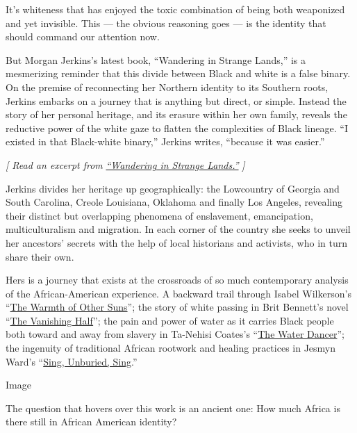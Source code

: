 It's whiteness that has enjoyed the toxic combination of being both
weaponized and yet invisible. This --- the obvious reasoning goes --- is
the identity that should command our attention now.

But Morgan Jerkins's latest book, ``Wandering in Strange Lands,'' is a
mesmerizing reminder that this divide between Black and white is a false
binary. On the premise of reconnecting her Northern identity to its
Southern roots, Jerkins embarks on a journey that is anything but
direct, or simple. Instead the story of her personal heritage, and its
erasure within her own family, reveals the reductive power of the white
gaze to flatten the complexities of Black lineage. ``I existed in that
Black-white binary,'' Jerkins writes, ``because it was easier.''

\emph{{[} Read an excerpt from}
\href{https://www.nytimes.com/2020/08/04/books/review/wandering-in-strange-lands-by-morgan-jerkins-an-excerpt.html}{\emph{``Wandering
in Strange Lands.''}} \emph{{]}}

Jerkins divides her heritage up geographically: the Lowcountry of
Georgia and South Carolina, Creole Louisiana, Oklahoma and finally Los
Angeles, revealing their distinct but overlapping phenomena of
enslavement, emancipation, multiculturalism and migration. In each
corner of the country she seeks to unveil her ancestors' secrets with
the help of local historians and activists, who in turn share their own.

Hers is a journey that exists at the crossroads of so much contemporary
analysis of the African-American experience. A backward trail through
Isabel Wilkerson's
``\href{https://www.nytimes.com/2010/08/31/books/31book.html}{The Warmth
of Other Suns}''; the story of white passing in Brit Bennett's novel
``\href{https://www.nytimes.com/2020/05/26/books/review-vanishing-half-brit-bennett.html}{The
Vanishing Half}''; the pain and power of water as it carries Black
people both toward and away from slavery in Ta-Nehisi Coates's
``\href{https://www.nytimes.com/2019/09/24/books/review/water-dancer-ta-nehisi-coates.html}{The
Water Dancer}''; the ingenuity of traditional African rootwork and
healing practices in Jesmyn Ward's
``\href{https://www.nytimes.com/2017/09/05/books/review-sing-unburied-sing-jesmyn-ward.html}{Sing,
Unburied, Sing}.''

Image

The question that hovers over this work is an ancient one: How much
Africa is there still in African American identity?

